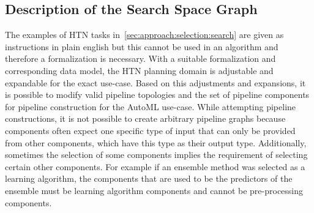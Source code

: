 \subsection{Description of the Search Space Graph}
\label{sec:approach:selection:graph}
The examples of HTN tasks in~\ref{sec:approach:selection:search} are given as instructions in plain english but this cannot be used in an algorithm and therefore a formalization is necessary.
With a suitable formalization and corresponding data model, the HTN planning domain is adjustable and expandable for the exact use-case.
Based on this adjustments and expansions, it is possible to modify valid pipeline topologies and the set of pipeline components for pipeline construction for the AutoML use-case.\newline
While attempting pipeline constructions, it is not possible to create arbitrary pipeline graphs because components often expect one specific type of input that can only be provided from other components, which have this type as their output type.
Additionally, sometimes the selection of some components implies the requirement of selecting certain other components.
For example if an ensemble method was selected as a learning algorithm, the components that are used to be the predictors of the ensemble must be learning algorithm components and cannot be pre-processing components.

